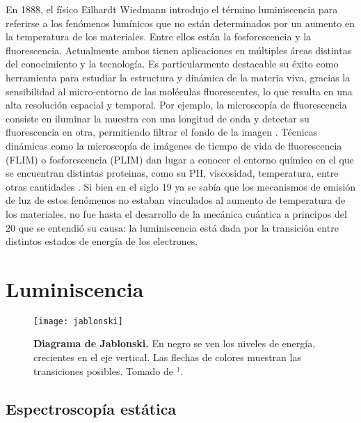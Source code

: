 En 1888, el físico Eilhardt Wiedmann introdujo el término luminiscencia para referirse a los fenómenos lumínicos que no están determinados por un aumento en la temperatura de los materiales.
Entre ellos están la fosforescencia y la fluorescencia.
Actualmente ambos tienen aplicaciones en múltiples áreas distintas del conocimiento y la tecnología. 
Es particularmente destacable su éxito como herramienta para estudiar la estructura y dinámica de la materia viva, gracias la sensibilidad al micro-entorno de las moléculas fluorescentes, lo que resulta en una alta resolución espacial y temporal. 
Por ejemplo, la microscopía de fluorescencia consiste en iluminar la muestra con una longitud de onda y detectar su fluorescencia en otra, permitiendo filtrar el fondo de la imagen \cite{valeur_introduction_2012}.
Técnicas dinámicas como la microscopía de imágenes de tiempo de vida de fluorescencia (FLIM) o fosforescencia (PLIM) dan lugar a conocer el entorno químico en el que se encuentran distintas proteinas, como su PH, viscosidad, temperatura, entre otras cantidades \cite{suhling_fluorescence_2015} \cite{baggaley_timeresolved_2015}.
Si bien en el siglo 19 ya se sabía que los mecanismos de emisión de luz de estos fenómenos no estaban vinculados al aumento de temperatura de los materiales, no fue hasta el desarrollo de la mecánica cuántica a principos del 20 que se entendió su causa: la luminiscencia está dada por la transición entre distintos estados de energía de los electrones.

\section{Luminiscencia}


\begin{figure}
    \centering
    \texttt{[image: jablonski]}
    \caption{\textbf{Diagrama de Jablonski.} En negro se ven los niveles de energía, crecientes en el eje vertical. Las flechas de colores muestran las transiciones posibles. Tomado de $^1$.}
    \label{fig:jablonski}
\end{figure}

\subsection{Espectroscopía estática}

